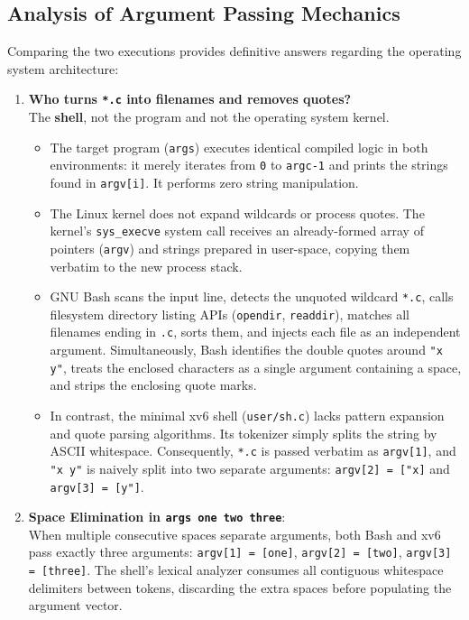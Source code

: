 \documentclass[12pt,a4paper]{article}
\begin{document}
\subsection{Analysis of Argument Passing Mechanics}
Comparing the two executions provides definitive answers regarding the operating system architecture:
\begin{enumerate}
    \item \textbf{Who turns \texttt{*.c} into filenames and removes quotes?}\\
    The \textbf{shell}, not the program and not the operating system kernel.
    \begin{itemize}
        \item The target program (\texttt{args}) executes identical compiled logic in both environments: it merely iterates from \texttt{0} to \texttt{argc-1} and prints the strings found in \texttt{argv[i]}. It performs zero string manipulation.
        \item The Linux kernel does not expand wildcards or process quotes. The kernel's \texttt{sys\_execve} system call receives an already-formed array of pointers (\texttt{argv}) and strings prepared in user-space, copying them verbatim to the new process stack.
        \item GNU Bash scans the input line, detects the unquoted wildcard \texttt{*.c}, calls filesystem directory listing APIs (\texttt{opendir}, \texttt{readdir}), matches all filenames ending in \texttt{.c}, sorts them, and injects each file as an independent argument. Simultaneously, Bash identifies the double quotes around \texttt{"x y"}, treats the enclosed characters as a single argument containing a space, and strips the enclosing quote marks.
        \item In contrast, the minimal xv6 shell (\texttt{user/sh.c}) lacks pattern expansion and quote parsing algorithms. Its tokenizer simply splits the string by ASCII whitespace. Consequently, \texttt{*.c} is passed verbatim as \texttt{argv[1]}, and \texttt{"x y"} is naively split into two separate arguments: \texttt{argv[2] = ["x]} and \texttt{argv[3] = [y"]}.
    \end{itemize}

    \item \textbf{Space Elimination in \texttt{args one   two      three}}:\\
    When multiple consecutive spaces separate arguments, both Bash and xv6 pass exactly three arguments: \texttt{argv[1] = [one]}, \texttt{argv[2] = [two]}, \texttt{argv[3] = [three]}. The shell's lexical analyzer consumes all contiguous whitespace delimiters between tokens, discarding the extra spaces before populating the argument vector.
\end{enumerate}
\end{document}

